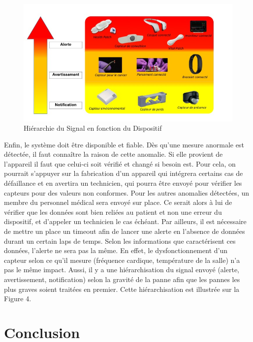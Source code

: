 \documentclass{article}
\begin{document}
\begin{figure}[h!]
	\hspace*{-2.5cm}
	\centering
	\includegraphics[width=1.5\textwidth]{Figure4.jpg}
	\caption{Hiérarchie du Signal en fonction du Dispositif}
	\label{fig:balance}
\end{figure}

Enfin, le système doit être disponible et fiable. Dès qu’une mesure anormale est détectée, il faut connaître la raison de cette anomalie. Si elle provient de l'appareil il faut que celui-ci soit vérifié et changé si besoin est. Pour cela, on pourrait s’appuyer sur la fabrication d'un appareil qui intégrera certains cas de défaillance et en avertira un technicien, qui pourra être envoyé pour vérifier les capteurs pour des valeurs non conformes. Pour les autres anomalies détectées, un membre du personnel médical sera envoyé sur place. Ce serait alors à lui de vérifier que les données sont bien reliées au patient et non une erreur du dispositif, et d'appeler un technicien le cas échéant. Par ailleurs, il est nécessaire de mettre un place un timeout afin de lancer une alerte en l’absence de données durant un certain laps de temps. Selon les informations que caractérisent ces données, l’alerte ne sera pas la même. En effet, le dysfonctionnement d’un capteur selon ce qu’il mesure (fréquence cardique, température de la salle) n’a pas le même impact. Aussi, il y a une hiérarchisation du signal envoyé (alerte, avertissement, notification) selon la gravité de la panne afin que les pannes les plus graves soient traitées en premier. Cette hiérarchisation est illustrée sur la Figure 4.

\section{ Conclusion }
 







\end{document}
